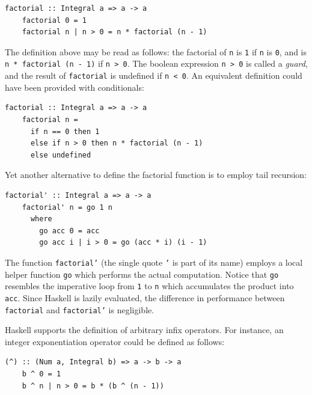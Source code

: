 \documentclass[UdineBachThesis,american,11pt]{PhdThesis}
\begin{document}
  \begin{Verbatim}[gobble=4,fontsize=\small]
    factorial :: Integral a => a -> a
    factorial 0 = 1
    factorial n | n > 0 = n * factorial (n - 1)
  \end{Verbatim}

  The definition above may be read as follows: the factorial of \texttt{n} is
  \texttt{1} if \texttt{n} is \texttt{0}, and is
  \mbox{\texttt{n * factorial (n - 1)}} if \mbox{\texttt{n > 0}}. The boolean
  expression \mbox{\texttt{n > 0}} is called a \emph{guard}, and the result of
  \mbox{\texttt{factorial}} is undefined if \mbox{\texttt{n < 0}}. An equivalent
  definition could have been provided with conditionals:

  \begin{Verbatim}[gobble=4,fontsize=\small]
    factorial :: Integral a => a -> a
    factorial n =
      if n == 0 then 1
      else if n > 0 then n * factorial (n - 1)
      else undefined
  \end{Verbatim}

  Yet another alternative to define the factorial function is to employ tail
  recursion:

  \pagebreak

  \begin{Verbatim}[gobble=4,fontsize=\small]
    factorial' :: Integral a => a -> a
    factorial' n = go 1 n
      where
        go acc 0 = acc
        go acc i | i > 0 = go (acc * i) (i - 1)
  \end{Verbatim}

  The function \mbox{\texttt{factorial'}} (the single quote \texttt{'} is part
  of its name) employs a local helper function \mbox{\texttt{go}} which performs
  the actual computation. Notice that \mbox{\texttt{go}} resembles the
  imperative loop from \texttt{1} to \texttt{n} which accumulates the product
  into \mbox{\texttt{acc}}. Since Haskell is lazily evaluated, the difference in
  performance between \mbox{\texttt{factorial}} and \mbox{\texttt{factorial'}}
  is negligible.

  Haskell supports the definition of arbitrary infix operators. For instance, an
  integer exponentiation operator could be defined as follows:

  \begin{Verbatim}[gobble=4,fontsize=\small]
    (^) :: (Num a, Integral b) => a -> b -> a
    b ^ 0 = 1
    b ^ n | n > 0 = b * (b ^ (n - 1))
  \end{Verbatim}
\end{document}
